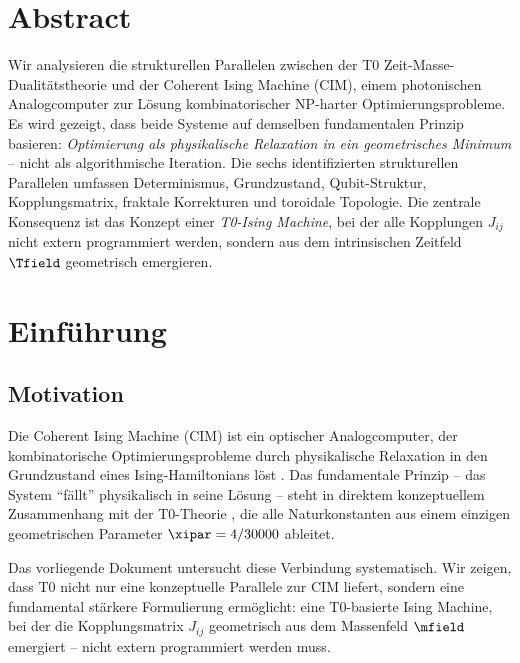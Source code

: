 
\section*{Abstract}

Wir analysieren die strukturellen Parallelen zwischen der T0 Zeit-Masse-Dualitätstheorie 
und der Coherent Ising Machine (CIM), einem photonischen Analogcomputer zur Lösung 
kombinatorischer NP-harter Optimierungsprobleme. Es wird gezeigt, dass beide Systeme 
auf demselben fundamentalen Prinzip basieren: \emph{Optimierung als physikalische 
Relaxation in ein geometrisches Minimum} -- nicht als algorithmische Iteration.
Die sechs identifizierten strukturellen Parallelen umfassen Determinismus, Grundzustand, 
Qubit-Struktur, Kopplungsmatrix, fraktale Korrekturen und toroidale Topologie.
Die zentrale Konsequenz ist das Konzept einer \emph{T0-Ising Machine}, bei der alle 
Kopplungen $J_{ij}$ nicht extern programmiert werden, sondern aus dem intrinsischen 
Zeitfeld $\Tfield$ geometrisch emergieren.

\clearpage

\section{Einführung}
\label{sec:intro}

\subsection{Motivation}

Die Coherent Ising Machine (CIM) ist ein optischer Analogcomputer, der kombinatorische 
Optimierungsprobleme durch physikalische Relaxation in den Grundzustand eines 
Ising-Hamiltonians löst \cite{inagaki_cim_2016, mcmahon_cim_2016}. Das fundamentale 
Prinzip -- das System ``fällt'' physikalisch in seine Lösung -- steht in direktem 
konzeptuellem Zusammenhang mit der T0-Theorie \cite{pascher_t0_2025}, die alle 
Naturkonstanten aus einem einzigen geometrischen Parameter $\xipar = 4/30000$ ableitet.

Das vorliegende Dokument untersucht diese Verbindung systematisch. Wir zeigen, dass 
T0 nicht nur eine konzeptuelle Parallele zur CIM liefert, sondern eine fundamental 
stärkere Formulierung ermöglicht: eine T0-basierte Ising Machine, bei der die 
Kopplungsmatrix $J_{ij}$ geometrisch aus dem Massenfeld $\mfield$ emergiert -- 
nicht extern programmiert werden muss.

